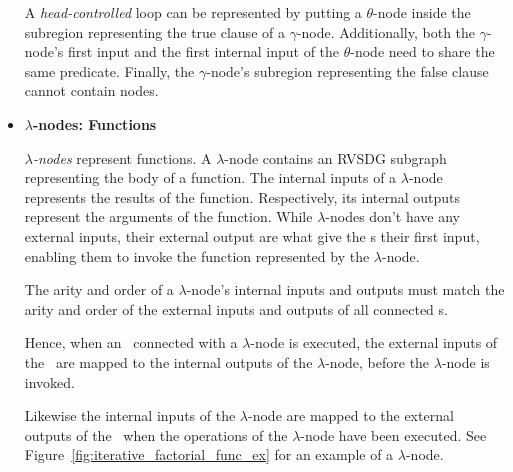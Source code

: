 \begin{itemize}
A \textit{head-controlled} loop can be represented by putting a $\theta$-node
inside the subregion representing the true clause of a $\gamma$-node.
Additionally, both the $\gamma$-node's first input and the first internal input
of the $\theta$-node need to share the same predicate. Finally, the
$\gamma$-node's subregion representing the false clause cannot contain nodes.

\item \textbf{$\lambda$-nodes: Functions}

\textit{$\lambda$-nodes} represent functions. A $\lambda$-node contains an RVSDG
subgraph representing the body of a function. The internal inputs of a
$\lambda$-node represents the results of the function. Respectively, its
internal outputs represent the arguments of the function. While $\lambda$-nodes
don't have any external inputs, their external output are what give the
\applyNode s their first input, enabling them to invoke the function represented
by the $\lambda$-node.

The arity and order of a $\lambda$-node's internal inputs and outputs must match
the arity and order of the external inputs and outputs of all connected
\applyNode s.

Hence, when an \applyNode~connected with a $\lambda$-node is executed, the
external inputs of the \applyNode~are mapped to the internal outputs of the
$\lambda$-node, before the $\lambda$-node is invoked.

Likewise the internal inputs of the $\lambda$-node are mapped to the external
outputs of the \applyNode~when the operations of the $\lambda$-node have been
executed. See Figure~\ref{fig:iterative_factorial_func_ex} for an example of a
$\lambda$-node.


\end{itemize}
